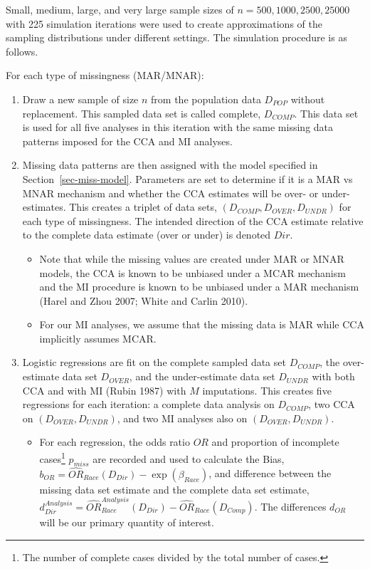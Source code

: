 \documentclass[
  letterpaper,
  DIV=11,
  numbers=noendperiod]{scrartcl}
\providecommand{\tightlist}{%
  \setlength{\itemsep}{0pt}\setlength{\parskip}{0pt}}\usepackage{longtable,booktabs,array}
\begin{document}
Small, medium, large, and very large sample sizes of
\(n = 500, 1000, 2500, 25000\) with 225 simulation iterations were used
to create approximations of the sampling distributions under different
settings. The simulation procedure is as follows.

For each type of missingness (MAR/MNAR):

\begin{enumerate}
\def\labelenumi{\arabic{enumi}.}
\tightlist
\item
  Draw a new sample of size \(n\) from the population data \(D_{POP}\)
  without replacement. This sampled data set is called complete,
  \(D_{COMP}\). This data set is used for all five analyses in this
  iteration with the same missing data patterns imposed for the CCA and
  MI analyses.
\item
  Missing data patterns are then assigned with the model specified in
  Section~\ref{sec-miss-model}. Parameters are set to determine if it is
  a MAR vs MNAR mechanism and whether the CCA estimates will be over- or
  under-estimates. This creates a triplet of data sets,
  \((D_{COMP}, D_{OVER}, D_{UNDR})\) for each type of missingness. The
  intended direction of the CCA estimate relative to the complete data
  estimate (over or under) is denoted \(Dir\).

  \begin{itemize}
  \tightlist
  \item
    Note that while the missing values are created under MAR or MNAR
    models, the CCA is known to be unbiased under a MCAR mechanism and
    the MI procedure is known to be unbiased under a MAR mechanism
    (Harel and Zhou 2007; White and Carlin 2010).
  \item
    For our MI analyses, we assume that the missing data is MAR while
    CCA implicitly assumes MCAR.
  \end{itemize}
\item
  Logistic regressions are fit on the complete sampled data set
  \(D_{COMP}\), the over-estimate data set \(D_{OVER}\), and the
  under-estimate data set \(D_{UNDR}\) with both CCA and with MI (Rubin
  1987) with \(M\) imputations. This creates five regressions for each
  iteration: a complete data analysis on \(D_{COMP}\), two CCA on
  \((D_{OVER}, D_{UNDR})\), and two MI analyses also on
  \((D_{OVER}, D_{UNDR})\).

  \begin{itemize}
  \tightlist
  \item
    For each regression, the odds ratio \(OR\) and proportion of
    incomplete cases\footnote{The number of complete cases divided by
      the total number of cases.} \(p_{miss}\) are recorded and used to
    calculate the Bias,
    \(b_{OR} = \hat{OR}_{Race}(D_{Dir}) - \exp(\beta_{Race})\), and
    difference between the missing data set estimate and the complete
    data set estimate,
    \(d_{Dir}^{Analysis} = \hat{OR}_{Race}^{Analysis}(D_{Dir}) - \hat{OR}_{Race}(D_{Comp})\).
    The differences \(d_{OR}\) will be our primary quantity of interest.
  \end{itemize}
\end{enumerate}
\end{document}
